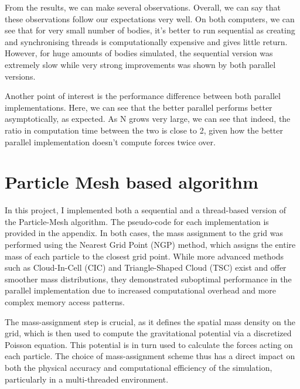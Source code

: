 \documentclass{article}
\begin{document}
From the results, we can make several observations. Overall, we can say that these observations follow our expectations very well. On both computers, we can see that for very small number of bodies, it's better to run sequential as creating and synchronising threads is computationally expensive and gives little return. However, for huge amounts of bodies simulated, the sequential version was extremely slow while very strong improvements was shown by both parallel versions.

Another point of interest is the performance difference between both parallel implementations. Here, we can see that the better parallel performs better asymptotically, as expected. As N grows very large, we can see that indeed, the ratio in computation time between the two is close to 2, given how the better parallel implementation doesn't compute forces twice over.



\section{Particle Mesh based algorithm}

In this project, I implemented both a sequential and a thread-based version of the Particle-Mesh algorithm. The pseudo-code for each implementation is provided in the appendix. In both cases, the mass assignment to the grid was performed using the Nearest Grid Point (NGP) method, which assigns the entire mass of each particle to the closest grid point. While more advanced methods such as Cloud-In-Cell (CIC) and Triangle-Shaped Cloud (TSC) exist and offer smoother mass distributions, they demonstrated suboptimal performance in the parallel implementation due to increased computational overhead and more complex memory access patterns.

The mass-assignment step is crucial, as it defines the spatial mass density on the grid, which is then used to compute the gravitational potential via a discretized Poisson equation. This potential is in turn used to calculate the forces acting on each particle. The choice of mass-assignment scheme thus has a direct impact on both the physical accuracy and computational efficiency of the simulation, particularly in a multi-threaded environment.
\end{document}

